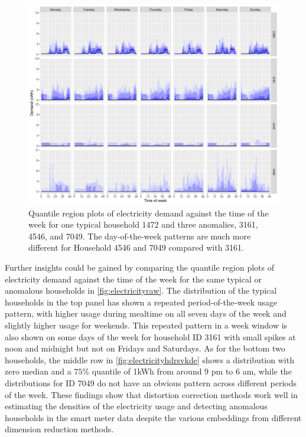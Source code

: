 \documentclass[12pt]{article}
\begin{document}
\begin{figure}

{\centering \includegraphics[width=0.95\linewidth]{figures/Electricity_2d_plot_hdrbox_7dow_4id_1typical_3anomalous} 

}

\caption{Quantile region plots of electricity demand against the time of the week for one typical household 1472 and three anomalies, 3161, 4546, and 7049. The day-of-the-week patterns are much more different for Household 4546 and 7049 compared with 3161.}\label{fig:electricityhdrsvkde}
\end{figure}

Further insights could be gained by comparing the quantile region plots of electricity demand against the time of the week for the same typical or anomalous households in \autoref{fig:electricityraw}. The distribution of the typical households in the top panel has shown a repeated period-of-the-week usage pattern, with higher usage during mealtime on all seven days of the week and slightly higher usage for weekends.
This repeated pattern in a week window is also shown on some days of the week for household ID 3161 with small spikes at noon and midnight but not on Fridays and Saturdays. As for the bottom two households, the middle row in \autoref{fig:electricityhdrsvkde} shows a distribution with zero median and a \(75\%\) quantile of 1kWh from around 9 pm to 6 am, while the distributions for ID 7049 do not have an obvious pattern across different periods of the week. These findings show that distortion correction methods work well in estimating the densities of the electricity usage and detecting anomalous households in the smart meter data despite the various embeddings from different dimension reduction methods.
\end{document}
